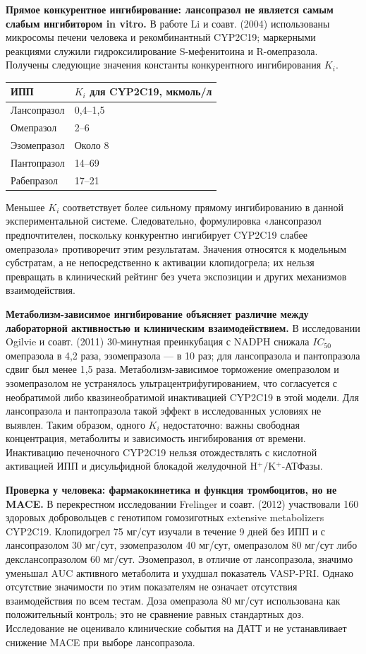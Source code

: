 \documentclass[11pt,a4paper,notitlepage]{report}
\newcommand{\src}[1]{\unskip\space\cite{#1}}
\begin{document}
\textbf{Прямое конкурентное ингибирование: лансопразол не является самым слабым ингибитором in vitro.} В работе Li и соавт. (2004) использованы микросомы печени человека и рекомбинантный CYP2C19; маркерными реакциями служили гидроксилирование S-мефенитоина и R-омепразола. Получены следующие значения константы конкурентного ингибирования $K_i$.\src{cardioli2004}
\begin{longtable}{P{0.32\textwidth}P{0.59\textwidth}}
\toprule
ИПП & $K_i$ для CYP2C19, мкмоль/л \\
\midrule
\endhead
Лансопразол & 0,4--1,5 \\
Омепразол & 2--6 \\
Эзомепразол & Около 8 \\
Пантопразол & 14--69 \\
Рабепразол & 17--21 \\
\bottomrule
\end{longtable}
Меньшее $K_i$ соответствует более сильному прямому ингибированию в данной экспериментальной системе. Следовательно, формулировка «лансопразол предпочтителен, поскольку конкурентно ингибирует CYP2C19 слабее омепразола» противоречит этим результатам. Значения относятся к модельным субстратам, а не непосредственно к активации клопидогрела; их нельзя превращать в клинический рейтинг без учета экспозиции и других механизмов взаимодействия.\src{cardioli2004}

\textbf{Метаболизм-зависимое ингибирование объясняет различие между лабораторной активностью и клиническим взаимодействием.} В исследовании Ogilvie и соавт. (2011) 30-минутная преинкубация с NADPH снижала $IC_{50}$ омепразола в 4,2 раза, эзомепразола --- в 10 раз; для лансопразола и пантопразола сдвиг был менее 1,5 раза. Метаболизм-зависимое торможение омепразолом и эзомепразолом не устранялось ультрацентрифугированием, что согласуется с необратимой либо квазинеобратимой инактивацией CYP2C19 в этой модели. Для лансопразола и пантопразола такой эффект в исследованных условиях не выявлен. Таким образом, одного $K_i$ недостаточно: важны свободная концентрация, метаболиты и зависимость ингибирования от времени. Инактивацию печеночного CYP2C19 нельзя отождествлять с кислотной активацией ИПП и дисульфидной блокадой желудочной H$^+$/K$^+$-АТФазы.\src{cardioogilvie2011,molcys}

\textbf{Проверка у человека: фармакокинетика и функция тромбоцитов, но не MACE.} В перекрестном исследовании Frelinger и соавт. (2012) участвовали 160 здоровых добровольцев с генотипом гомозиготных extensive metabolizers CYP2C19. Клопидогрел 75 мг/сут изучали в течение 9 дней без ИПП и с лансопразолом 30 мг/сут, эзомепразолом 40 мг/сут, омепразолом 80 мг/сут либо декслансопразолом 60 мг/сут. Эзомепразол, в отличие от лансопразола, значимо уменьшал AUC активного метаболита и ухудшал показатель VASP-PRI. Однако отсутствие значимости по этим показателям не означает отсутствия взаимодействия по всем тестам. Доза омепразола 80 мг/сут использована как положительный контроль; это не сравнение равных стандартных доз. Исследование не оценивало клинические события на ДАТТ и не устанавливает снижение MACE при выборе лансопразола.\src{cardiofrelinger2012}
\end{document}
